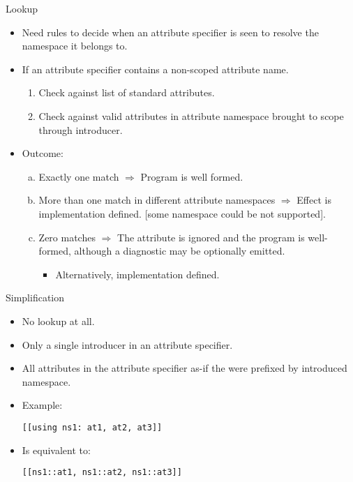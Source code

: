 \begin{frame}[t,shrink]{Lookup}
\begin{itemize}
  \item Need rules to decide when an attribute specifier is seen to resolve the namespace
        it belongs to.
\end{itemize}
\vfill\pause
\begin{itemize}
  \item If an attribute specifier contains a non-scoped attribute name.
    \begin{enumerate}[1]
      \item Check against list of standard attributes.
      \item Check against valid attributes in attribute namespace brought to scope through  introducer.
    \end{enumerate}
  \pause
  \item Outcome:
    \begin{enumerate}[a)]
      \item Exactly one match $\Rightarrow$ Program is well formed.
      
      \item More than one match in different attribute namespaces
      $\Rightarrow$
      Effect is implementation defined. [some namespace could be not supported].
      
      \item Zero matches 
      $\Rightarrow$
      The attribute is ignored and the
      program is well-formed, although a diagnostic may be optionally emitted.
        \begin{itemize}
          \item Alternatively, implementation defined.
        \end{itemize}
    \end{enumerate}
\end{itemize}
\end{frame}

\begin{frame}[t,fragile]{Simplification}
\begin{itemize}
  \item No lookup at all.
  \item Only a single introducer in an attribute specifier.
  \item All attributes in the attribute specifier as-if the were prefixed by introduced namespace.
  \item Example:
\begin{lstlisting}
[[using ns1: at1, at2, at3]]
\end{lstlisting}
  \item Is equivalent to:
\begin{lstlisting}
[[ns1::at1, ns1::at2, ns1::at3]]
\end{lstlisting}
\end{itemize}
\end{frame}

